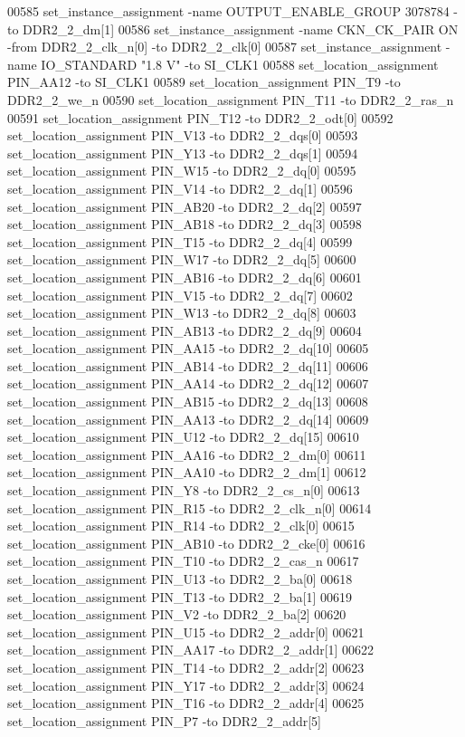 \begin{DoxyCode}
00585 set\_instance\_assignment -name OUTPUT\_ENABLE\_GROUP \textcolor{vhdllogic}{3078784} -to DDR2\_2\_dm[1]
00586 set\_instance\_assignment -name CKN\_CK\_PAIR \textcolor{keywordflow}{ON} -from DDR2\_2\_clk\_n[0] -to DDR2\_2\_clk[0]
00587 set\_instance\_assignment -name IO\_STANDARD "1.\textcolor{vhdllogic}{8} V" -to SI\_CLK1
00588 set\_location\_assignment PIN\_AA12 -to SI\_CLK1
00589 set\_location\_assignment PIN\_T9 -to DDR2\_2\_we\_n
00590 set\_location\_assignment PIN\_T11 -to DDR2\_2\_ras\_n
00591 set\_location\_assignment PIN\_T12 -to DDR2\_2\_odt[0]
00592 set\_location\_assignment PIN\_V13 -to DDR2\_2\_dqs[0]
00593 set\_location\_assignment PIN\_Y13 -to DDR2\_2\_dqs[1]
00594 set\_location\_assignment PIN\_W15 -to DDR2\_2\_dq[0]
00595 set\_location\_assignment PIN\_V14 -to DDR2\_2\_dq[1]
00596 set\_location\_assignment PIN\_AB20 -to DDR2\_2\_dq[2]
00597 set\_location\_assignment PIN\_AB18 -to DDR2\_2\_dq[3]
00598 set\_location\_assignment PIN\_T15 -to DDR2\_2\_dq[4]
00599 set\_location\_assignment PIN\_W17 -to DDR2\_2\_dq[5]
00600 set\_location\_assignment PIN\_AB16 -to DDR2\_2\_dq[6]
00601 set\_location\_assignment PIN\_V15 -to DDR2\_2\_dq[7]
00602 set\_location\_assignment PIN\_W13 -to DDR2\_2\_dq[8]
00603 set\_location\_assignment PIN\_AB13 -to DDR2\_2\_dq[9]
00604 set\_location\_assignment PIN\_AA15 -to DDR2\_2\_dq[10]
00605 set\_location\_assignment PIN\_AB14 -to DDR2\_2\_dq[11]
00606 set\_location\_assignment PIN\_AA14 -to DDR2\_2\_dq[12]
00607 set\_location\_assignment PIN\_AB15 -to DDR2\_2\_dq[13]
00608 set\_location\_assignment PIN\_AA13 -to DDR2\_2\_dq[14]
00609 set\_location\_assignment PIN\_U12 -to DDR2\_2\_dq[15]
00610 set\_location\_assignment PIN\_AA16 -to DDR2\_2\_dm[0]
00611 set\_location\_assignment PIN\_AA10 -to DDR2\_2\_dm[1]
00612 set\_location\_assignment PIN\_Y8 -to DDR2\_2\_cs\_n[0]
00613 set\_location\_assignment PIN\_R15 -to DDR2\_2\_clk\_n[0]
00614 set\_location\_assignment PIN\_R14 -to DDR2\_2\_clk[0]
00615 set\_location\_assignment PIN\_AB10 -to DDR2\_2\_cke[0]
00616 set\_location\_assignment PIN\_T10 -to DDR2\_2\_cas\_n
00617 set\_location\_assignment PIN\_U13 -to DDR2\_2\_ba[0]
00618 set\_location\_assignment PIN\_T13 -to DDR2\_2\_ba[1]
00619 set\_location\_assignment PIN\_V2 -to DDR2\_2\_ba[2]
00620 set\_location\_assignment PIN\_U15 -to DDR2\_2\_addr[0]
00621 set\_location\_assignment PIN\_AA17 -to DDR2\_2\_addr[1]
00622 set\_location\_assignment PIN\_T14 -to DDR2\_2\_addr[2]
00623 set\_location\_assignment PIN\_Y17 -to DDR2\_2\_addr[3]
00624 set\_location\_assignment PIN\_T16 -to DDR2\_2\_addr[4]
00625 set\_location\_assignment PIN\_P7 -to DDR2\_2\_addr[5]

\end{DoxyCode}

